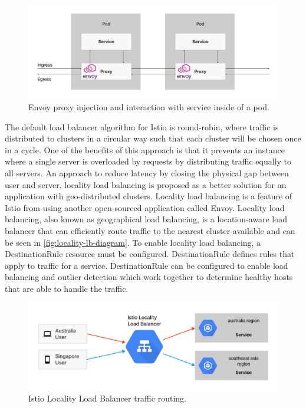\begin{figure}
	\centering
	\includegraphics[width=1\textwidth]{assets/diagrams/envoy-proxy.png}
	\caption{Envoy proxy injection and interaction with service inside of a pod.}
	\label{fig:envoy-proxy-injection}
\end{figure}

The default load balancer algorithm for Istio is round-robin, where traffic is distributed to clusters in a circular way such that each cluster will be chosen once in a cycle. One of the benefits of this approach is that it prevents an instance where a single server is overloaded by requests by distributing traffic equally to all servers. An approach to reduce latency by closing the physical gap between user and server, locality load balancing is proposed as a better solution for an application with geo-distributed clusters. Locality load balancing is a feature of Istio from using another open-sourced application called Envoy. Locality load balancing, also known as geographical load balancing, is a location-aware load balancer that can efficiently route traffic to the nearest cluster available and can be seen in \autoref{fig:locality-lb-diagram}. To enable locality load balancing, a DestinationRule resource must be configured. DestinationRule defines rules that apply to traffic for a service. DestinationRule can be configured to enable load balancing and outlier detection which work together to determine healthy hosts that are able to handle the traffic.

\begin{figure}
	\centering
	\includegraphics[width=1\textwidth]{assets/diagrams/locality-lb-diagram.png}
	\caption{Istio Locality Load Balancer traffic routing.}
	\label{fig:locality-lb-diagram}
\end{figure}


